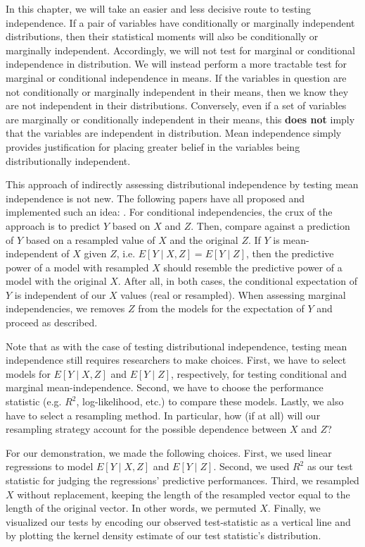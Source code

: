 In this chapter, we will take an easier and less decisive route to testing independence.
If a pair of variables have conditionally or marginally independent distributions, then their statistical moments will also be conditionally or marginally independent.
Accordingly, we will not test for marginal or conditional independence in distribution.
We will instead perform a more tractable test for marginal or conditional independence in means.
If the variables in question are not conditionally or marginally independent in their means, then we know they are not independent in their distributions.
Conversely, even if a set of variables are marginally or conditionally independent in their means, this \textbf{does not} imply that the variables are independent in distribution.
Mean independence simply provides justification for placing greater belief in the variables being distributionally independent.

This approach of indirectly assessing distributional independence by testing mean independence is not new.
The following papers have all proposed and implemented such an idea: \citet{burkart_2017_predictive, chalupka_2018_fast, inacio_2019_conditional}.
For conditional independencies, the crux of the approach is to predict $Y$ based on $X$ and $Z$.
Then, compare against a prediction of $Y$ based on a resampled value of $X$ and the original $Z$.
If $Y$ is mean-independent of $X$ given $Z$, i.e. $E \left[ Y \mid X, Z \right] = E\left[ Y \mid Z \right]$, then the predictive power of a model with resampled $X$ should resemble the predictive power of a model with the original $X$.
After all, in both cases, the conditional expectation of $Y$ is independent of our $X$ values (real or resampled).
When assessing marginal independencies, we removes $Z$ from the models for the expectation of $Y$ and proceed as described.

Note that as with the case of testing distributional independence, testing mean independence still requires researchers to make choices.
First, we have to select models for $E \left[ Y \mid X, Z \right]$ and $E\left[ Y \mid Z \right]$, respectively, for testing conditional and marginal mean-independence.
Second, we have to choose the performance statistic (e.g. $R^2$, log-likelihood, etc.) to compare these models.
Lastly, we also have to select a resampling method.
In particular, how (if at all) will our resampling strategy account for the possible dependence between $X$ and $Z$?

For our demonstration, we made the following choices.
First, we used linear regressions to model $E \left[Y \mid X, Z \right]$ and $E \left[ Y \mid Z \right]$.
Second, we used $R^2$ as our test statistic for judging the regressions' predictive performances.
Third, we resampled $X$ without replacement, keeping the length of the resampled vector equal to the length of the original vector.
In other words, we permuted $X$.
Finally, we visualized our tests by encoding our observed test-statistic as a vertical line and by plotting the kernel density estimate of our test statistic's distribution.

